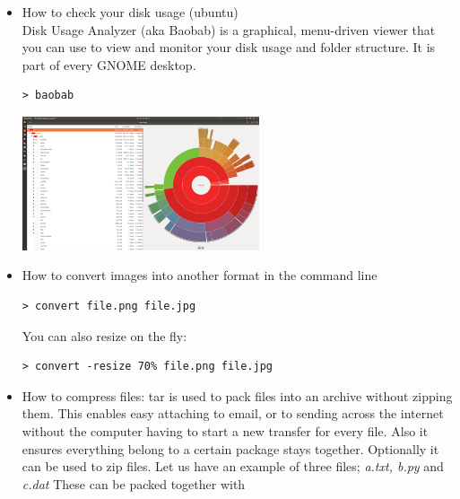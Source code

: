 \begin{itemize}
\item How to check your disk usage (ubuntu)\\

Disk Usage Analyzer (aka Baobab) is a graphical, menu-driven viewer 
that you can use to view and monitor your disk usage and folder structure. 
It is part of every GNOME desktop.

\begin{mdframed}[backgroundcolor=gray!10]
\begin{verbatim}
> baobab
\end{verbatim}
\end{mdframed}

\begin{center}
\includegraphics[width=7cm]{images/baobab}
\end{center}


\item How to convert images into another format in the command line

\begin{mdframed}[backgroundcolor=gray!10]
\begin{verbatim}
> convert file.png file.jpg
\end{verbatim}
\end{mdframed}

You can also resize on the fly:

\begin{mdframed}[backgroundcolor=gray!10]
\begin{verbatim}
> convert -resize 70% file.png file.jpg
\end{verbatim}
\end{mdframed}


\item How to compress files:
tar is used to pack files into an archive without zipping them. 
This enables easy attaching to email, or to sending across the internet without the computer having
to start a new transfer for every file. 
Also it ensures everything belong to a certain package stays together.
Optionally it can be used to zip files.
Let us have an example of three files; {\it a.txt, b.py} and {\it c.dat}
These can be packed together with


\end{itemize}
